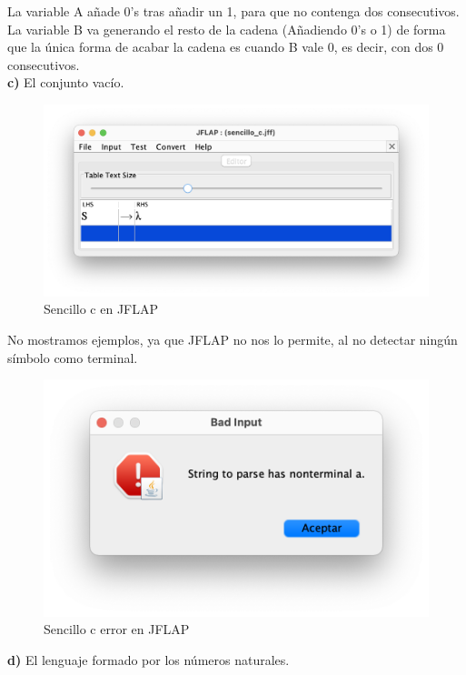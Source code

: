 La variable A añade 0's tras añadir un 1, para que no contenga dos consecutivos. La variable B va generando el resto de la cadena (Añadiendo 0's o 1)
de forma que la única forma de acabar la cadena es cuando B vale 0, es decir, con dos 0 consecutivos. 
\\

\textbf{c)}  El conjunto vacío. 

\begin{figure}[H] 
	\centering
	\includegraphics[scale=0.5]{../practica_1/images/sencillo_c.png} 
	\caption{Sencillo c en JFLAP} 
    \label{fig:sencillo_c}
\end{figure}

No mostramos ejemplos, ya que JFLAP no nos lo permite, al no detectar ningún símbolo como terminal.

\begin{figure}[H] 
	\centering
	\includegraphics[scale=0.5]{../practica_1/images/sencillo_c_err.png} 
	\caption{Sencillo c error en JFLAP} 
    \label{fig:sencillo_c_err}
\end{figure}

\textbf{d)}  El lenguaje formado por los números naturales.

